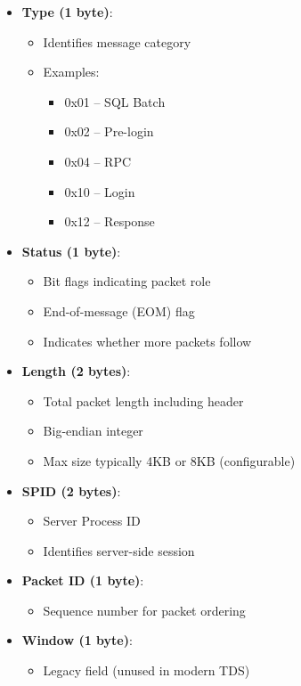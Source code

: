 \begin{itemize}
    \item \textbf{Type (1 byte)}:
    \begin{itemize}
        \item Identifies message category
        \item Examples:
        \begin{itemize}
            \item 0x01 – SQL Batch
            \item 0x02 – Pre-login
            \item 0x04 – RPC
            \item 0x10 – Login
            \item 0x12 – Response
        \end{itemize}
    \end{itemize}
    
    \item \textbf{Status (1 byte)}:
    \begin{itemize}
        \item Bit flags indicating packet role
        \item End-of-message (EOM) flag
        \item Indicates whether more packets follow
    \end{itemize}
    
    \item \textbf{Length (2 bytes)}:
    \begin{itemize}
        \item Total packet length including header
        \item Big-endian integer
        \item Max size typically 4KB or 8KB (configurable)
    \end{itemize}
    
    \item \textbf{SPID (2 bytes)}:
    \begin{itemize}
        \item Server Process ID
        \item Identifies server-side session
    \end{itemize}
    
    \item \textbf{Packet ID (1 byte)}:
    \begin{itemize}
        \item Sequence number for packet ordering
    \end{itemize}
    
    \item \textbf{Window (1 byte)}:
    \begin{itemize}
        \item Legacy field (unused in modern TDS)
    \end{itemize}
\end{itemize}

